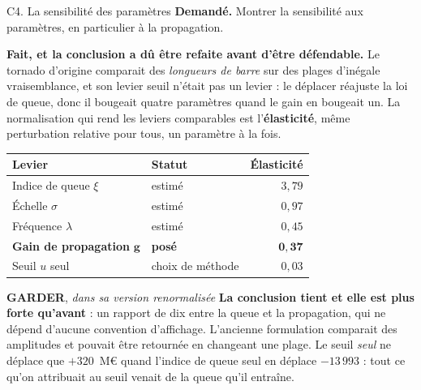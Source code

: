 \documentclass[11pt]{beamer}
\newcommand{\garder}{\textbf{GARDER}}
\newcommand{\srcs}[1]{\vspace{0.8mm}{\tiny\textcolor{gray!50!black}{Sources : #1}}}
\begin{document}
\begin{frame}{C4. La sensibilité des paramètres}
\scriptsize
\textbf{Demandé.} Montrer la sensibilité aux paramètres, en particulier à la propagation.
\vspace{1mm}

\textbf{Fait, et la conclusion a dû être refaite avant d'être défendable.} Le tornado d'origine
comparait des \emph{longueurs de barre} sur des plages d'inégale vraisemblance, et son levier
\og seuil \fg{} n'était pas un levier : le déplacer réajuste la loi de queue, donc il bougeait quatre
paramètres quand le gain en bougeait un. La normalisation qui rend les leviers comparables est
l'\textbf{élasticité}, même perturbation relative pour tous, un paramètre à la fois.
\begin{center}
\begin{tabular}{@{}l l r@{}}
\toprule
\textbf{Levier} & \textbf{Statut} & \textbf{Élasticité} \\
\midrule
Indice de queue $\xi$ & estimé & $3{,}79$ \\
Échelle $\sigma$ & estimé & $0{,}97$ \\
Fréquence $\lambda$ & estimé & $0{,}45$ \\
\textbf{Gain de propagation} $\boldsymbol{g}$ & \textbf{posé} & $\mathbf{0{,}37}$ \\
Seuil $u$ seul & choix de méthode & $0{,}03$ \\
\bottomrule
\end{tabular}
\end{center}
\vspace{-1mm}
\begin{block}{\garder, \emph{dans sa version renormalisée}}
\textbf{La conclusion tient et elle est plus forte qu'avant} : un rapport de dix entre la queue
et la propagation, qui ne dépend d'aucune convention d'affichage. L'ancienne formulation
comparait des amplitudes et pouvait être retournée en changeant une plage. Le seuil \emph{seul}
ne déplace que $+320$~M\euro{} quand l'indice de queue seul en déplace $-13\,993$ : tout ce
qu'on attribuait au seuil venait de la queue qu'il entraîne.
\end{block}
\srcs{scripts~\texttt{15}, \texttt{30} et~\texttt{76}}
\end{frame}
\end{document}
